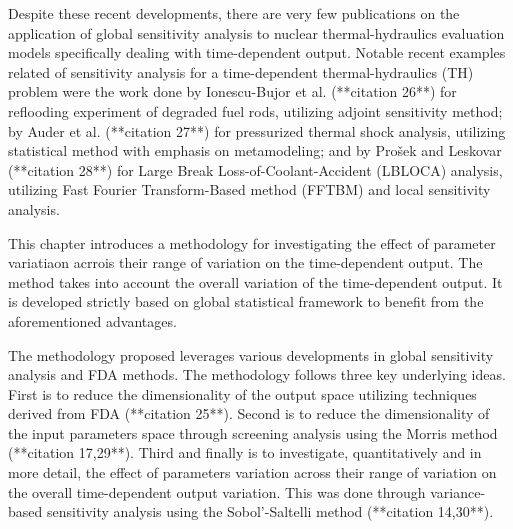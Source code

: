 Despite these recent developments, 
there are very few publications on the application of global sensitivity analysis to nuclear thermal-hydraulics evaluation models specifically dealing with time-dependent output.
Notable recent examples related of sensitivity analysis for a time-dependent thermal-hydraulics (TH) problem were the work done by Ionescu-Bujor et al. (**citation 26**) 
for reflooding experiment of degraded fuel rods, utilizing adjoint sensitivity method; 
by Auder et al. (**citation 27**) for pressurized thermal shock analysis, 
utilizing statistical method with emphasis on metamodeling; 
and by Prošek and Leskovar (**citation 28**) for Large Break Loss-of-Coolant-Accident (LBLOCA) analysis, 
utilizing Fast Fourier Transform-Based method (FFTBM) and local sensitivity analysis.

This chapter introduces a methodology for investigating the effect of parameter variatiaon acrrois their range of variation on the time-dependent output.
The method takes into account the overall variation of the time-dependent output. 
It is developed strictly based on global statistical framework to benefit from the aforementioned advantages.

The methodology proposed leverages various developments in global sensitivity analysis and FDA methods. 
The methodology follows three key underlying ideas. 
First is to reduce the dimensionality of the output space utilizing techniques derived from FDA (**citation 25**). 
Second is to reduce the dimensionality of the input parameters space through screening analysis using the Morris method (**citation 17,29**). 
Third and finally is to investigate, quantitatively and in more detail, the effect of parameters variation across their range of variation on the overall time-dependent output variation. 
This was done through variance-based sensitivity analysis using the Sobol’-Saltelli method (**citation 14,30**). 